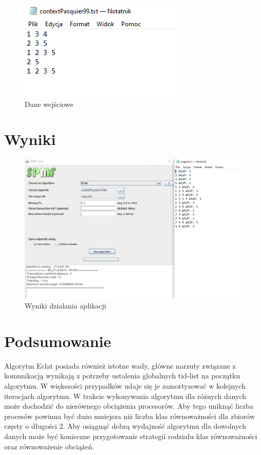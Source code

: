 \documentclass{article}
\begin{document}
		\begin{figure}[!h]
			\centering
			\includegraphics[scale=0.4]{DaneWejsciowe.png}
			\caption{Dane wejściowe}
		\end{figure}	
		
	\newpage
		
	\section{Wyniki}

		\begin{figure}[!h]
			\centering
			\includegraphics[scale=0.4]{Wejscie.png}
			\caption{Wyniki dzialania aplikacji}
		\end{figure}
		
	\section{Podsumowanie}

Algorytm Eclat posiada również istotne wady, główne narzuty związane z komunikacją wynikają z potrzeby ustalenia globalnych tid-list na początku algorytmu. W większości przypadków udaje się je zamortyzować w kolejnych iteracjach algorytmu. W trakcie wykonywania algorytmu dla różnych danych może dochodzić do nierównego obciążenia procesorów. Aby tego uniknąć liczba procesów powinna być dużo mniejsza niż liczba klas równoważności dla zbiorów częsty o długości 2. Aby osiągnąć dobrą wydajność algorytmu dla dowolnych danych może być konieczne przygotowanie strategii rodziału klas równoważności oraz równoważenie obciążeń.
\end{document}
